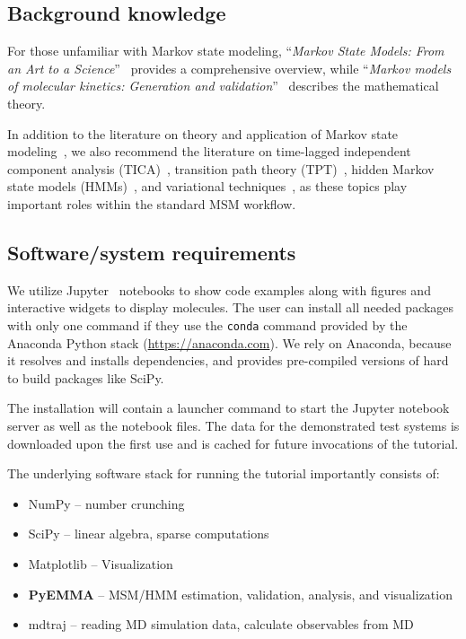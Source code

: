 \documentclass[9pt,tutorial]{livecoms}
\begin{document}
\subsection{Background knowledge}
\label{sec:background}

For those unfamiliar with Markov state modeling, ``\emph{Markov State Models: From an Art to a Science}''~\cite{msm-brooke} provides a comprehensive overview, while ``\emph{Markov models of molecular kinetics: Generation and validation}''~\cite{msm-jhp} describes the mathematical theory. 

In addition to the literature on theory and application of Markov state modeling~\cite{msm-book,buchete-msm-2008,noe-tmat-sampling,bowman-msm-2009,noe-folding-pathways,sarich-msm-quality,noe-fingerprints,noe-dy-neut-scatt,Chodera2014,ben-rev-msm,simon-mech-mod-nmr,oom-feliks}, we also recommend the literature on time-lagged independent component analysis (TICA)~\cite{tica,tica3,tica2,kinetic-maps}, transition path theory (TPT)~\cite{weinan-tpt,metzner-msm-tpt}, hidden Markov state models (HMMs)~\cite{noe-proj-hid-msm,hmm-baum-welch-alg,hmm-tutorial}, and variational techniques~\cite{noe-vac,vamp-preprint,gmrq}, as these topics play important roles within the standard MSM workflow.

\subsection{Software/system requirements}

We utilize Jupyter~\cite{jupyter} notebooks to show code examples along with figures and interactive widgets to display molecules. The user can install all needed packages with only one command if they use the \texttt{conda} command provided by the Anaconda Python stack (\url{https://anaconda.com}). We rely on Anaconda, because it resolves and installs dependencies, and provides pre-compiled versions of hard to build packages like SciPy.

The installation will contain a launcher command to start the Jupyter notebook server as well as the notebook files. The data for the demonstrated test systems is downloaded upon the first use and is cached for future invocations of the tutorial.

The underlying software stack for running the tutorial importantly consists of:
\begin{itemize}
\item NumPy -- number crunching~\cite{numpy}
\item SciPy -- linear algebra, sparse computations~\cite{scipy}
\item Matplotlib -- Visualization~\cite{matplotlib}
\item \textbf{PyEMMA} -- MSM/HMM estimation, validation, analysis, and visualization~\cite{pyemma}
\item mdtraj -- reading MD simulation data, calculate observables from MD~\cite{mdtraj}
\end{itemize}
\end{document}
